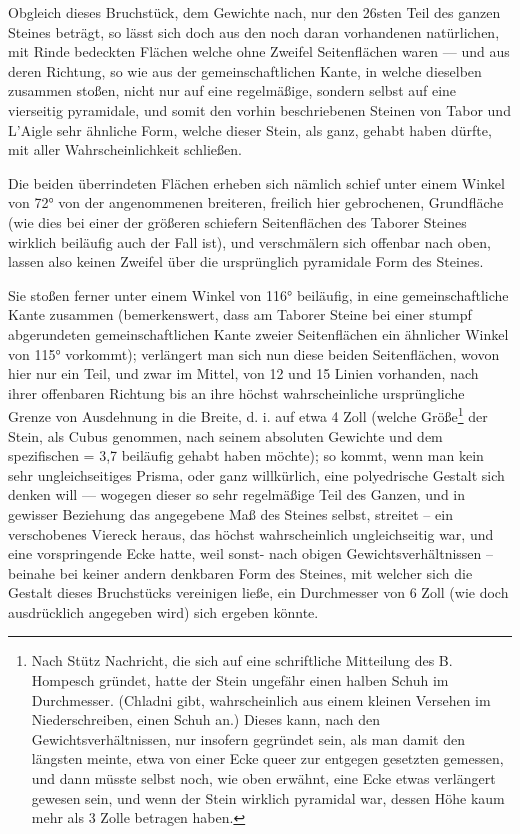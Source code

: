 \documentclass[a4paper, 11pt, oneside, german]{article}
\begin{document}
Obgleich dieses Bruchstück, dem Gewichte nach, nur den 26sten Teil des ganzen Steines beträgt, so lässt sich doch aus den noch daran vorhandenen natürlichen, mit Rinde bedeckten Flächen welche ohne Zweifel Seitenflächen waren --- und aus deren Richtung, so wie aus der gemeinschaftlichen Kante, in welche dieselben zusammen stoßen, nicht nur auf eine regelmäßige, sondern selbst auf eine vierseitig pyramidale, und somit den vorhin beschriebenen Steinen von Tabor und L'Aigle sehr ähnliche Form, welche dieser Stein, als ganz, gehabt haben dürfte, mit aller Wahrscheinlichkeit schließen.

Die beiden überrindeten Flächen erheben sich nämlich schief unter einem Winkel von 72° von der angenommenen breiteren, freilich hier gebrochenen, Grundfläche (wie dies bei einer der größeren schiefern Seitenflächen des Taborer Steines wirklich beiläufig auch der Fall ist), und verschmälern sich offenbar nach oben, lassen also keinen Zweifel über die ursprünglich pyramidale Form des Steines.

Sie stoßen ferner unter einem Winkel von 116° beiläufig, in eine gemeinschaftliche Kante zusammen (bemerkenswert, dass am Taborer Steine bei einer stumpf abgerundeten gemeinschaftlichen Kante zweier Seitenflächen ein ähnlicher Winkel von 115° vorkommt); verlängert man sich nun diese beiden Seitenflächen, wovon hier nur ein Teil, und zwar im Mittel, von 12 und 15 Linien vorhanden, nach ihrer offenbaren Richtung bis an ihre höchst wahrscheinliche ursprüngliche Grenze von Ausdehnung in die Breite, d. i. auf etwa 4 Zoll (welche Größe\footnote{Nach Stütz Nachricht, die sich auf eine schriftliche Mitteilung des B. Hompesch gründet, hatte der Stein ungefähr einen halben Schuh im Durchmesser. (Chladni gibt, wahrscheinlich aus einem kleinen Versehen im Niederschreiben, einen Schuh an.) Dieses kann, nach den Gewichtsverhältnissen, nur insofern gegründet sein, als man damit den längsten meinte, etwa von einer Ecke queer zur entgegen gesetzten gemessen, und dann müsste selbst noch, wie oben erwähnt, eine Ecke etwas verlängert gewesen sein, und wenn der Stein wirklich pyramidal war, dessen Höhe kaum mehr als 3 Zolle betragen haben.} der Stein, als Cubus genommen, nach seinem absoluten Gewichte und dem spezifischen = 3,7 beiläufig gehabt haben möchte); so kommt, wenn man kein sehr ungleichseitiges Prisma, oder ganz willkürlich, eine polyedrische Gestalt sich denken will --- wogegen dieser so sehr regelmäßige Teil des Ganzen, und in gewisser Beziehung das angegebene Maß des Steines selbst, streitet -- ein verschobenes Viereck heraus, das höchst wahrscheinlich ungleichseitig war, und eine vorspringende Ecke hatte, weil sonst- nach obigen Gewichtsverhältnissen -- beinahe bei keiner andern denkbaren Form des Steines, mit welcher sich die Gestalt dieses Bruchstücks vereinigen ließe, ein Durchmesser von 6 Zoll (wie doch ausdrücklich angegeben wird) sich ergeben könnte.
\end{document}

